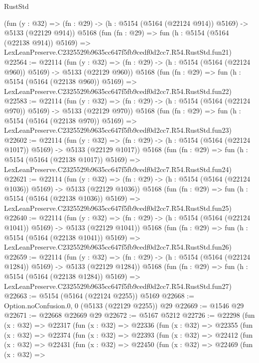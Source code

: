 \begin{lexlean}{RustStd}
\begin{coremodule}
    (fun (y : @32) => (fn : @29) -> (h : @5154 (@5164 (@22124 @914)) @5169) -> @5133 (@22129 @914))
    @5168
    (fun (fn : @29) =>
    fun (h : @5154 (@5164 (@22138 @914)) @5169) =>
    LexLeanPreserve.C2325529b9635cc647f5fb9cedf0d2cc7.R54.RustStd.fun21)
@22564 := @22114
    (fun (y : @32) => (fn : @29) -> (h : @5154 (@5164 (@22124 @960)) @5169) -> @5133 (@22129 @960))
    @5168
    (fun (fn : @29) =>
    fun (h : @5154 (@5164 (@22138 @960)) @5169) =>
    LexLeanPreserve.C2325529b9635cc647f5fb9cedf0d2cc7.R54.RustStd.fun22)
@22583 := @22114
    (fun (y : @32) => (fn : @29) -> (h : @5154 (@5164 (@22124 @970)) @5169) -> @5133 (@22129 @970))
    @5168
    (fun (fn : @29) =>
    fun (h : @5154 (@5164 (@22138 @970)) @5169) =>
    LexLeanPreserve.C2325529b9635cc647f5fb9cedf0d2cc7.R54.RustStd.fun23)
@22602 := @22114
    (fun (y : @32) =>
    (fn : @29) -> (h : @5154 (@5164 (@22124 @1017)) @5169) -> @5133 (@22129 @1017))
    @5168
    (fun (fn : @29) =>
    fun (h : @5154 (@5164 (@22138 @1017)) @5169) =>
    LexLeanPreserve.C2325529b9635cc647f5fb9cedf0d2cc7.R54.RustStd.fun24)
@22621 := @22114
    (fun (y : @32) =>
    (fn : @29) -> (h : @5154 (@5164 (@22124 @1036)) @5169) -> @5133 (@22129 @1036))
    @5168
    (fun (fn : @29) =>
    fun (h : @5154 (@5164 (@22138 @1036)) @5169) =>
    LexLeanPreserve.C2325529b9635cc647f5fb9cedf0d2cc7.R54.RustStd.fun25)
@22640 := @22114
    (fun (y : @32) =>
    (fn : @29) -> (h : @5154 (@5164 (@22124 @1041)) @5169) -> @5133 (@22129 @1041))
    @5168
    (fun (fn : @29) =>
    fun (h : @5154 (@5164 (@22138 @1041)) @5169) =>
    LexLeanPreserve.C2325529b9635cc647f5fb9cedf0d2cc7.R54.RustStd.fun26)
@22659 := @22114
    (fun (y : @32) =>
    (fn : @29) -> (h : @5154 (@5164 (@22124 @1284)) @5169) -> @5133 (@22129 @1284))
    @5168
    (fun (fn : @29) =>
    fun (h : @5154 (@5164 (@22138 @1284)) @5169) =>
    LexLeanPreserve.C2325529b9635cc647f5fb9cedf0d2cc7.R54.RustStd.fun27)
@22663 := @5154 (@5164 (@22124 @2255)) @5169
@22668 := Option.noConfusion.{0, 0} (@5133 (@22129 @2255)) @29
@22669 := @1546 @29
@22671 := @22668 @22669 @29
@22672 := @5167 @5212
@22726 := @22298
    (fun (x : @32) =>
    @22317
      (fun (x : @32) =>
      @22336
        (fun (x : @32) =>
        @22355
          (fun (x : @32) =>
          @22374
            (fun (x : @32) =>
            @22393
              (fun (x : @32) =>
              @22412
                (fun (x : @32) =>
                @22431
                  (fun (x : @32) =>
                  @22450
                    (fun (x : @32) =>
                    @22469
                      (fun (x : @32) =>

\end{coremodule}
\end{lexlean}
